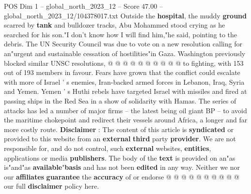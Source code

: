 \begin{textsample}{POS Dim 1 – global\_north\_2023\_12 – Score 47.00 – global\_north\_2023\_12/104378017.txt}
Outside the \textbf{hospital}, the muddy \textbf{ground} scarred by \textbf{tank} and bulldozer tracks, Abu Mohammed stood crying as he searched for his son."I don't know how I will find him,"he said, pointing to the debris.
The UN Security Council was due to vote on a new resolution calling for an"urgent and sustainable cessation of hostilities"in Gaza.
Washington previously blocked similar UNSC resolutions, @ @ @ @ @ @ @ @ @ @ to fighting, with 153 out of 193 members in favour.
Fears have grown that the conflict could escalate with more of Israel ' s enemies, Iran-backed armed forces in Lebanon, Iraq, Syria and Yemen.
Yemen ' s Huthi rebels have targeted Israel with missiles and fired at passing ships in the Red Sea in a show of solidarity with Hamas.
The series of attacks has led a number of major firms -- the latest being oil giant BP -- to avoid the maritime chokepoint and redirect their vessels around Africa, a longer and far more costly route. \textbf{Disclaimer} : The content of this article is \textbf{syndicated} or provided to this website from an \textbf{external} \textbf{third} party \textbf{provider}.
We are not responsible for, and do not control, such \textbf{external} websites, \textbf{entities}, applications or media \textbf{publishers}.
The body of the \textbf{text} is provided on an"as is"and"as \textbf{available}"\textbf{basis} and has not been \textbf{edited} in any way.
Neither we nor our \textbf{affiliates} \textbf{guarantee} the \textbf{accuracy} of or endorse @ @ @ @ @ @ @ @ @ @ our full \textbf{disclaimer} policy here.

\end{textsample}
